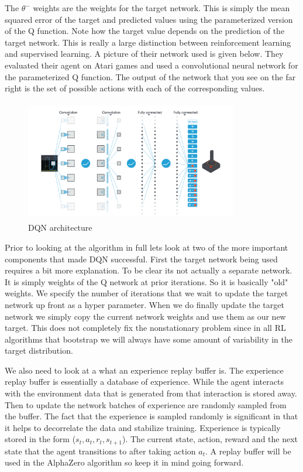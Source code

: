 The $\theta^{-}$ weights are the weights for the target network. This is simply the mean squared error of the target and predicted values using the parameterized version of the Q function. Note how the target value depends on the prediction of the target network. This is really a large distinction between reinforcement learning and supervised learning. A picture of their network used is given below. They evaluated their agent on Atari games and used a convolutional neural network for the parameterized Q function. The output of the network that you see on the far right is the set of possible actions with each of the corresponding values. 

\begin{figure}[H]
    \centering
    \includegraphics[width=350px,height=200px]{images/DQN_architecture.png}
    \caption{DQN architecture}
    \label{fig:my_label}
\end{figure}

Prior to looking at the algorithm in full lets look at two of the more important components that made DQN successful. First the target network being used requires a bit more explanation. To be clear its not actually a separate network. It is simply weights of the Q network at prior iterations. So it is basically "old" weights. We specify the number of iterations that we wait to update the target network up front as a hyper parameter. When we do finally update the target network we simply copy the current network weights and use them as our new target. This does not completely fix the nonstationary problem since in all RL algorithms that bootstrap we will always have some amount of variability in the target distribution. 

We also need to look at a what an experience replay buffer is. The experience replay buffer is essentially a database of experience. While the agent interacts with the environment data that is generated from that interaction is stored away. Then to update the network batches of experience are randomly sampled from the buffer. The fact that the experience is sampled randomly is significant in that it helps to decorrelate the data and stabilize training. Experience is typically stored in the form ($s_{t},a_{t},r_{t},s_{t + 1}$). The current state, action, reward and the next state that the agent transitions to after taking action $a_{t}$. A replay buffer will be used in the AlphaZero algorithm so keep it in mind going forward. 

